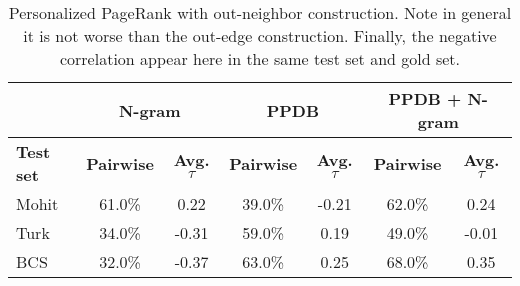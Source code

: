 \begin{table}
\small
\centering
\begin{tabular}{|l|cc|cc|cc|}
	\hline 
	& \multicolumn{2}{c|}{N-gram} 
	& \multicolumn{2}{c|}{PPDB} 
	& \multicolumn{2}{c|}{PPDB + N-gram} \\
	\hline 
	\bf Test set
	& \bf Pairwise & \bf Avg. $\tau$  
	& \bf Pairwise & \bf Avg. $\tau$  
	& \bf Pairwise & \bf Avg. $\tau$  \\ 
	\hline
	Mohit & 61.0\% &  0.22 & 39.0\%  & -0.21  & 62.0\% &  0.24 \\
	Turk  & 34.0\% & -0.31 & 59.0\%  &  0.19  & 49.0\% & -0.01 \\
	BCS   & 32.0\% & -0.37 & 63.0\%  &  0.25  & 68.0\% &  0.35 \\
	\hline
\end{tabular}
\caption{\label{font-table} Personalized PageRank with out-neighbor construction. Note in general it is not worse than the out-edge construction. Finally, the negative correlation appear here in the same test set and gold set. }
\end{table}\newpage


































